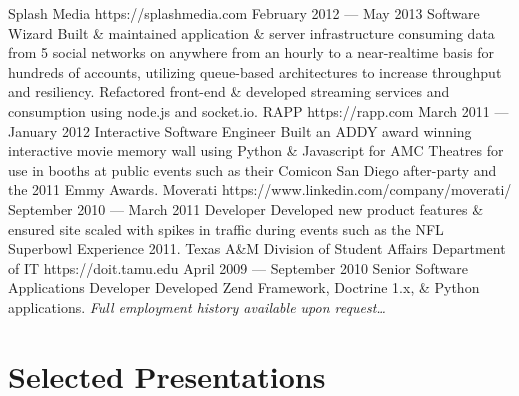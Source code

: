 \documentclass{resume}
\begin{document}
\employer
    {Splash Media}
    {https://splashmedia.com}
    {February 2012 --- May 2013}
    {Software Wizard}
    {Built \& maintained application \& server infrastructure consuming data from 5 social networks on anywhere from an hourly to a near-realtime basis for hundreds of accounts, utilizing queue-based architectures to increase throughput and resiliency. Refactored front-end \& developed streaming services and consumption using node.js and socket.io.}
\employer
    {RAPP}
    {https://rapp.com}
    {March 2011 --- January 2012}
    {Interactive Software Engineer}
    {Built an ADDY award winning interactive movie memory wall using Python \& Javascript for AMC Theatres for use in booths at public events such as their Comicon San Diego after-party and the 2011 Emmy Awards.}
\employer
    {Moverati}
    {https://www.linkedin.com/company/moverati/}
    {September 2010 --- March 2011}
    {Developer}
    {Developed new product features \& ensured site scaled with spikes in traffic during events such as the NFL Superbowl Experience 2011.}
\employer
    {Texas A\&M Division of Student Affairs Department of IT}
    {https://doit.tamu.edu}
    {April 2009 --- September 2010}
    {Senior Software Applications Developer}
    {Developed Zend Framework, Doctrine 1.x, \& Python applications.}
\emph{Full employment history available upon request\ldots}


\section{Selected Presentations}
\end{document}
